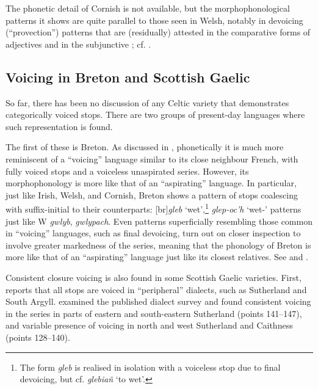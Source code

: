 \documentclass[output=paper,colorlinks,citecolor=brown]{langscibook}
\begin{document}
The phonetic detail of Cornish is not available, but the morphophonological patterns it shows are quite parallel to those seen in Welsh, notably in devoicing (\enquote{provection}) patterns that are (residually) attested in the comparative forms of adjectives  and in the subjunctive ; cf. \textcite{williams2011middle}. 

\subsection{Voicing in Breton and Scottish Gaelic}
\label{sec:voic-bret-scott}

So far, there has been no discussion of any Celtic variety that demonstrates categorically voiced  stops. There are two groups of present\hyp day languages where such representation is found.

The first of these is Breton. As discussed in \textcite{iosad2022breton}, phonetically it is much more reminiscent of a \enquote{voicing} language similar to its close neighbour French, with fully voiced  stops and a voiceless unaspirated  series. However, its morphophonology is more like that of an \enquote{aspirating} language. In particular, just like Irish, Welsh, and Cornish, Breton shows a pattern of  stops coalescing with suffix\hyp initial  to their  counterparts: [br]\textit{gleb} `{wet}',\footnote{The form \textit{gleb} is realised in isolation with a voiceless stop due to final devoicing, but cf. \textit{glebiañ} `{to wet}'.} \textit{glep-oc'h} `{wet-\Cmp}' patterns just like W \textit{gwlyb}, \textit{gwlypach}. Even patterns superficially resembling those common in \enquote{voicing} languages, such as final devoicing, turn out on closer inspection to involve greater markedness of the  series, meaning that the phonology of Breton is more like that of an \enquote{aspirating} language just like its closest relatives. See \textcite{iosad16} and \textcite{iosad2022breton}.

Consistent closure voicing is also found in some Scottish Gaelic varieties. First, \textcite{henderson1903gaelic} reports that all  stops are voiced in \enquote{peripheral} dialects, such as Sutherland  and South Argyll. \Textcite{allen2022plosive} examined the published dialect survey \parencite{sgds} and found consistent voicing in the  series in parts of eastern and south-eastern Sutherland (points 141--147), and variable presence of voicing in north and west Sutherland and Caithness (points 128--140).
\end{document}
